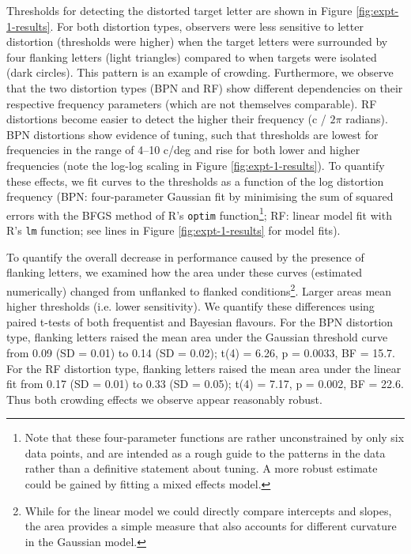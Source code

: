 \documentclass[doc, 11pt,a4paper,natbib]{apa6}\usepackage[]{graphicx}\usepackage[]{color}
\begin{document}
Thresholds for detecting the distorted target letter are shown in Figure \ref{fig:expt-1-results}.
For both distortion types, observers were less sensitive to letter distortion (thresholds were higher) when the target letters were surrounded by four flanking letters (light triangles) compared to when targets were isolated (dark circles).
This pattern is an example of crowding.
Furthermore, we observe that the two distortion types (BPN and RF) show different dependencies on their respective frequency parameters (which are not themselves comparable).
RF distortions become easier to detect the higher their frequency (c / $2\pi$ radians).
BPN distortions show evidence of tuning, such that thresholds are lowest for frequencies in the range of 4--10 c/deg and rise for both lower and higher frequencies (note the log-log scaling in Figure \ref{fig:expt-1-results}).
To quantify these effects, we fit curves to the thresholds as a function of the log distortion frequency (BPN: four-parameter Gaussian fit by minimising the sum of squared errors with the BFGS method of R's \texttt{optim} function\footnote{Note that these four-parameter functions are rather unconstrained by only six data points, and are intended as a rough guide to the patterns in the data rather than a definitive statement about tuning. A more robust estimate could be gained by fitting a mixed effects model.}; RF: linear model fit with R's \texttt{lm} function; see lines in Figure \ref{fig:expt-1-results} for model fits).



To quantify the overall decrease in performance caused by the presence of flanking letters, we examined how the area under these curves (estimated numerically) changed from unflanked to flanked conditions\footnote{While for the linear model we could directly compare intercepts and slopes, the area provides a simple measure that also accounts for different curvature in the Gaussian model.}.
Larger areas mean higher thresholds (i.e. lower sensitivity).
We quantify these differences using paired t-tests of both frequentist and Bayesian \citep{rouder_default_2012, morey_bayesfactor_2015} flavours.
For the BPN distortion type,
flanking letters raised the mean area under the Gaussian threshold curve from
0.09
(SD = 0.01) to
0.14
(SD = 0.02);
t(4) = 6.26, p = 0.0033, BF = 15.7.
For the RF distortion type,
flanking letters raised the mean area under the linear fit from
0.17
(SD = 0.01) to
0.33
(SD = 0.05);
t(4) = 7.17, p = 0.002, BF = 22.6.
Thus both crowding effects we observe appear reasonably robust.
\end{document}
